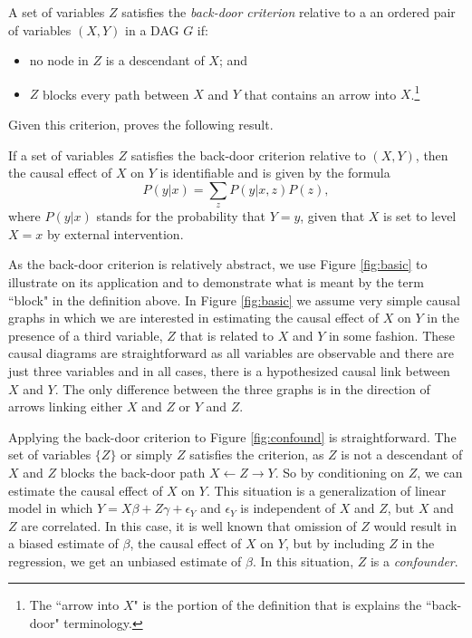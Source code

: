 \documentclass[11pt]{amsart}
\begin{document}
\begin{definition}
A set of variables $Z$ satisfies the \emph{back-door criterion} relative to a an ordered pair of variables $(X, Y)$ in a 
	DAG $G$ if:
	\begin{itemize}
		\item no node in $Z$ is a descendant of $X$; and
		\item $Z$ blocks every path between $X$ and $Y$ that contains an arrow into $X$.\footnote{The ``arrow into $X$" is the portion of the definition that is explains the ``back-door" terminology.}
	\end{itemize}
\end{definition}
Given this criterion, \citet{Pearl:2009kh} proves the following result.
\begin{theorem}
	If a set of variables $Z$ satisfies the back-door criterion relative to $(X, Y)$, then the causal effect of $X$ on $Y$ is identifiable and is given by the formula 
	\[ P(y | x) = \sum_{z} P(y | x, z) P(z), \]
where $P(y|x)$ stands for the probability that $Y = y$, given that $X$ is set to level $X=x$ by external intervention.
\end{theorem}




As the back-door criterion is relatively abstract, we use Figure \ref{fig:basic} to illustrate on its application and to demonstrate what is meant by the term ``block" in the definition above.
In Figure \ref{fig:basic} we assume very simple causal graphs in which we are interested in estimating the causal effect of $X$ on $Y$ in the presence of a third variable, $Z$ that is related to $X$ and $Y$ in some fashion.
These causal diagrams are straightforward as all variables are observable and there are just three variables and in all cases, there is a hypothesized causal link between $X$ and $Y$.
The only difference between the three graphs is in the direction of arrows linking either $X$ and $Z$ or $Y$ and $Z$.

Applying the back-door criterion to Figure \ref{fig:confound} is straightforward. The set of variables $\{Z\}$ or simply $Z$ satisfies the criterion, as $Z$ is not a descendant of $X$ and $Z$ blocks the back-door path $X \leftarrow Z \rightarrow Y$.
So by conditioning on $Z$, we can estimate the causal effect of $X$ on $Y$.
This situation is a generalization of linear model in which $Y = X \beta + Z \gamma + \epsilon_Y$ and $\epsilon_Y$ is independent of $X$ and $Z$, but $X$ and $Z$ are correlated.
In this case, it is well known that omission of $Z$ would result in a biased estimate of $\beta$, the causal effect of $X$ on $Y$, but by including $Z$ in the regression, we get an unbiased estimate of $\beta$.
In this situation, $Z$ is a \emph{confounder}.
\end{document}
